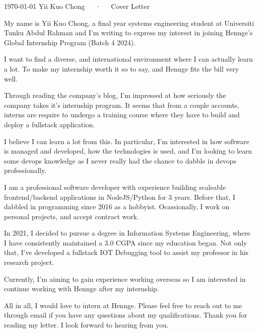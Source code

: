 \documentclass[11pt, a4paper]{awesome-cv}
\begin{document}
\makecvheader[R]

\makecvfooter
  {\today}
  {Yii Kuo Chong~~~·~~~Cover Letter}
  {}

\makelettertitle

\begin{cvletter}

My name is Yii Kuo Chong, a final year systems engineering student at Universiti Tunku Abdul Rahman and I'm writing to express my interest in joining Hennge's Global Internship Program (Batch 4 2024).

I want to find a diverse, and international environment where I can actually learn a lot. To make my internship worth it so to say, and Hennge fits the bill very well.

Through reading the company's blog, I'm impressed at how seriously the company takes it's internship program. It seems that from a couple accounts, interns are require to undergo a training course where they have to build and deploy a fullstack application. 

I believe I can learn a lot from this. In particular, I'm interested in how software is managed and developed, how the technologies is used, and I'm looking to learn some devops knowledge as I never really had the chance to dabble in devops professionally.

I am a professional software developer with experience building scaleable frontend/backend applications in NodeJS/Python for 3 years. Before that, I dabbled in programming since 2016 as a hobbyist. Ocassionally, I work on personal projects, and accept contract work.

In 2021, I decided to pursue a degree in Information Systems Engineering, where I have consistently maintained a 3.0 CGPA since my education began. Not only that, I've developed a fullstack IOT Debugging tool to assist my professor in his research project.

Currently, I'm aiming to gain experience working overseas so I am interested in continue working with Hennge after my internship.

All in all, I would love to intern at Hennge. Please feel free to reach out to me through email if you have any questions about my qualifications. Thank you for reading my letter. I look forward to hearing from you.

\end{cvletter}

\makeletterclosing
\end{document}
